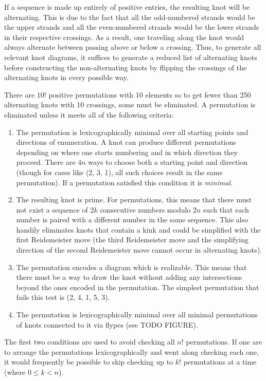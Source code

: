 \begin{paper}

If a sequence is made up entirely of positive entries, the resulting knot will
be alternating.
This is due to the fact that all the odd-numbered strands would be the upper
strands and all the even-numbered strands would be the lower strands in their
respective crossings.
As a result, one traveling along the knot would always alternate between passing
above or below a crossing.
Thus, to generate all relevant knot diagrams, it suffices to generate a reduced
list of alternating knots before constructing the non-alternating knots by
flipping the crossings of the alternating knots in every possible way.

There are $10!$ positive permutations with 10 elements so to get fewer than 250
alternating knots with 10 crossings, some must be eliminated.
A permutation is eliminated unless it meets all of the following criteria:

\begin{enumerate}
\item The permutation is lexicographically minimal over all starting points and
directions of enumeration.
A knot can produce different permutations depending on where one starts
numbering and in which direction they proceed.
There are $4n$ ways to choose both a starting point and direction (though for
cases like (2, 3, 1), all such choices result in the same permutation).
If a permutation satisfied this condition it is \textit{minimal}.
\item The resulting knot is prime.
For permutations, this means that there must not exist a sequence of $2k$
consecutive numbers modulo $2n$ such that each number is paired with a different
number in the same sequence.
This also handily eliminates knots that contain a kink and could be simplified
with the first Reidemeister move (the third Reidemeister move and the
simplifying direction of the second Reidemeister move cannot occur in
alternating knots).
\item The permutation encodes a diagram which is realizable.
This means that there must be a way to draw the knot without adding any
intersections beyond the ones encoded in the permutation.
The simplest permutation that fails this test is (2, 4, 1, 5, 3).
\item The permutation is lexicographically minimal over all minimal
permutations of knots connected to it via flypes (see TODO FIGURE).
\end{enumerate}

The first two conditions are used to avoid checking all $n!$ permutations.
If one are to arrange the permutations lexicographically and went along
checking each one, it would frequently be possible to skip checking up to $k!$
permutations at a time (where $0\leq k<n$).


\end{paper}
